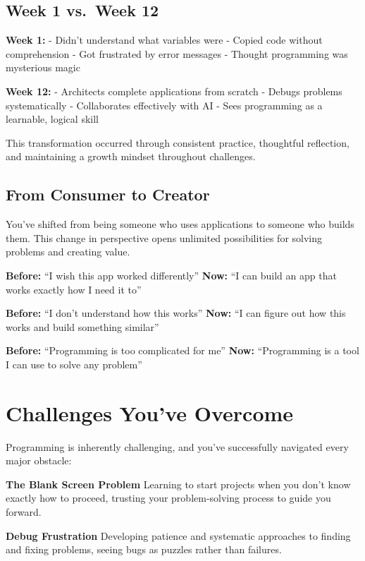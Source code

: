 \documentclass[
  letterpaper,
  DIV=11,
  numbers=noendperiod,
  oneside]{scrreprt}
\begin{document}
\subsection{Week 1 vs.~Week 12}\label{week-1-vs.-week-12-1}

\textbf{Week 1:} - Didn't understand what variables were - Copied code
without comprehension - Got frustrated by error messages - Thought
programming was mysterious magic

\textbf{Week 12:} - Architects complete applications from scratch -
Debugs problems systematically - Collaborates effectively with AI - Sees
programming as a learnable, logical skill

This transformation occurred through consistent practice, thoughtful
reflection, and maintaining a growth mindset throughout challenges.

\subsection{From Consumer to Creator}\label{from-consumer-to-creator}

You've shifted from being someone who uses applications to someone who
builds them. This change in perspective opens unlimited possibilities
for solving problems and creating value.

\textbf{Before:} ``I wish this app worked differently'' \textbf{Now:}
``I can build an app that works exactly how I need it to''

\textbf{Before:} ``I don't understand how this works'' \textbf{Now:} ``I
can figure out how this works and build something similar''

\textbf{Before:} ``Programming is too complicated for me'' \textbf{Now:}
``Programming is a tool I can use to solve any problem''

\section{Challenges You've Overcome}\label{challenges-youve-overcome}

Programming is inherently challenging, and you've successfully navigated
every major obstacle:

\textbf{The Blank Screen Problem} Learning to start projects when you
don't know exactly how to proceed, trusting your problem-solving process
to guide you forward.

\textbf{Debug Frustration} Developing patience and systematic approaches
to finding and fixing problems, seeing bugs as puzzles rather than
failures.
\end{document}
